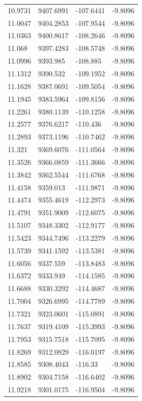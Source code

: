 \begin{table}[H]
\begin{tabular}{llll}
10.9731 & 9407.6991 & -107.6441 & -9.8096 \\
11.0047 & 9404.2853 & -107.9544 & -9.8096 \\
11.0363 & 9400.8617 & -108.2646 & -9.8096 \\
11.068 & 9397.4283 & -108.5748 & -9.8096 \\
11.0996 & 9393.985 & -108.885 & -9.8096 \\
11.1312 & 9390.532 & -109.1952 & -9.8096 \\
11.1628 & 9387.0691 & -109.5054 & -9.8096 \\
11.1945 & 9383.5964 & -109.8156 & -9.8096 \\
11.2261 & 9380.1139 & -110.1258 & -9.8096 \\
11.2577 & 9376.6217 & -110.436 & -9.8096 \\
11.2893 & 9373.1196 & -110.7462 & -9.8096 \\
11.321 & 9369.6076 & -111.0564 & -9.8096 \\
11.3526 & 9366.0859 & -111.3666 & -9.8096 \\
11.3842 & 9362.5544 & -111.6768 & -9.8096 \\
11.4158 & 9359.013 & -111.9871 & -9.8096 \\
11.4474 & 9355.4619 & -112.2973 & -9.8096 \\
11.4791 & 9351.9009 & -112.6075 & -9.8096 \\
11.5107 & 9348.3302 & -112.9177 & -9.8096 \\
11.5423 & 9344.7496 & -113.2279 & -9.8096 \\
11.5739 & 9341.1592 & -113.5381 & -9.8096 \\
11.6056 & 9337.559 & -113.8483 & -9.8096 \\
11.6372 & 9333.949 & -114.1585 & -9.8096 \\
11.6688 & 9330.3292 & -114.4687 & -9.8096 \\
11.7004 & 9326.6995 & -114.7789 & -9.8096 \\
11.7321 & 9323.0601 & -115.0891 & -9.8096 \\
11.7637 & 9319.4109 & -115.3993 & -9.8096 \\
11.7953 & 9315.7518 & -115.7095 & -9.8096 \\
11.8269 & 9312.0829 & -116.0197 & -9.8096 \\
11.8585 & 9308.4043 & -116.33 & -9.8096 \\
11.8902 & 9304.7158 & -116.6402 & -9.8096 \\
11.9218 & 9301.0175 & -116.9504 & -9.8096 \\

\end{tabular}
\end{table}
